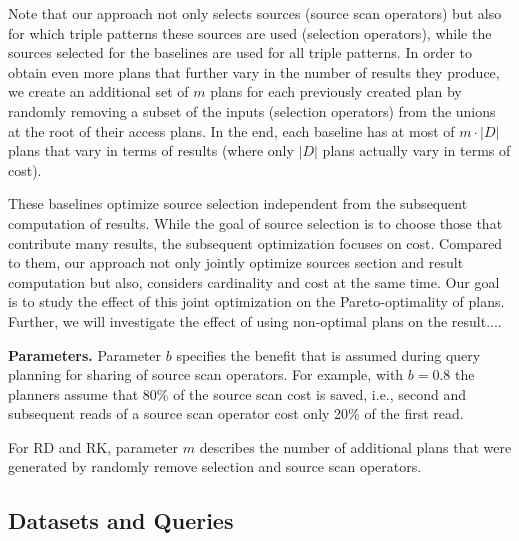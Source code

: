 Note that our approach not only selects sources (source scan
operators) but also for which triple patterns these sources are used
(selection operators), while the sources selected for the baselines
are used for all triple patterns. In order to obtain even more plans
that further vary in the number of results they produce, we create an
additional set of $m$ plans for each previously created plan by
randomly removing a subset of the inputs (selection operators) from
the unions at the root of their access plans.
In the end, each baseline has at most of $m \cdot |D|$ plans that vary
in terms of results (where only $|D|$ plans actually vary in terms of
cost).

These baselines optimize source selection independent from the
subsequent computation of results. While the goal of source selection
is to choose those that contribute many results, the subsequent
optimization focuses on cost. Compared to them, our approach not only
jointly optimize sources section and result computation but also,
considers cardinality and cost at the same time. Our goal is to study
the effect of this joint optimization on the Pareto-optimality of
plans. Further, we will investigate the effect of using non-optimal
plans on the result....


\textbf{Parameters.} Parameter $b$ specifies the benefit that is
assumed during query planning for sharing of source scan
operators. For example, with $b=0.8$ the planners assume that 80\% of
the source scan cost is saved, i.e., second and subsequent reads of a
source scan operator cost only 20\% of the first read.

For RD and RK, parameter $m$ describes the number of additional plans
that were generated by randomly remove selection and source scan
operators.

\subsection{Datasets and Queries}

